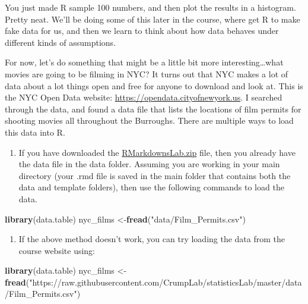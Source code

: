 \documentclass[]{book}
\newenvironment{Shaded}{\begin{snugshade}}{\end{snugshade}}
\newcommand{\KeywordTok}[1]{\textcolor[rgb]{0.13,0.29,0.53}{\textbf{#1}}}
\newcommand{\StringTok}[1]{\textcolor[rgb]{0.31,0.60,0.02}{#1}}
\newcommand{\NormalTok}[1]{#1}
\providecommand{\tightlist}{%
  \setlength{\itemsep}{0pt}\setlength{\parskip}{0pt}}
\begin{document}
You just made R sample 100 numbers, and then plot the results in a
histogram. Pretty neat. We'll be doing some of this later in the course,
where get R to make fake data for us, and then we learn to think about
how data behaves under different kinds of assumptions.

For now, let's do something that might be a little bit more
interesting\ldots{}what movies are going to be filming in NYC? It turns
out that NYC makes a lot of data about a lot things open and free for
anyone to download and look at. This is the NYC Open Data website:
\url{https://opendata.cityofnewyork.us}. I searched through the data,
and found a data file that lists the locations of film permits for
shooting movies all throughout the Burroughs. There are multiple ways to
load this data into R.

\begin{enumerate}
\def\labelenumi{\arabic{enumi}.}
\tightlist
\item
  If you have downloaded the
  \href{https://github.com/CrumpLab/statisticsLab/raw/master/RMarkdownsLab.zip}{RMarkdownsLab.zip}
  file, then you already have the data file in the data folder. Assuming
  you are working in your main directory (your .rmd file is saved in the
  main folder that contains both the data and template folders), then
  use the following commands to load the data.
\end{enumerate}

\begin{Shaded}
\begin{Highlighting}[]
\KeywordTok{library}\NormalTok{(data.table)}
\NormalTok{nyc_films <-}\KeywordTok{fread}\NormalTok{(}\StringTok{"data/Film_Permits.csv"}\NormalTok{)}
\end{Highlighting}
\end{Shaded}

\begin{enumerate}
\def\labelenumi{\arabic{enumi}.}
\setcounter{enumi}{1}
\tightlist
\item
  If the above method doesn't work, you can try loading the data from
  the course website using:
\end{enumerate}

\begin{Shaded}
\begin{Highlighting}[]
\KeywordTok{library}\NormalTok{(data.table)}
\NormalTok{nyc_films <-}\StringTok{ }\KeywordTok{fread}\NormalTok{(}\StringTok{"https://raw.githubusercontent.com/CrumpLab/statisticsLab/master/data/Film_Permits.csv"}\NormalTok{)}
\end{Highlighting}
\end{Shaded}
\end{document}
